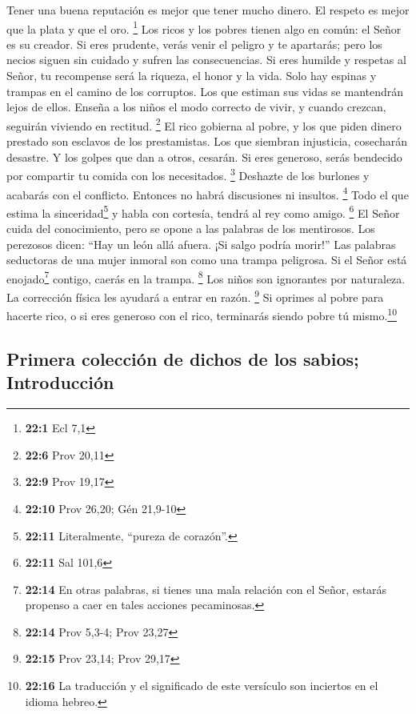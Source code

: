  Tener una buena reputación es mejor que tener mucho
dinero. El respeto es mejor que la plata y que el oro. \footnote{\textbf{22:1}
  Ecl 7,1}  Los ricos y los pobres tienen algo en común:
el Señor es su creador.  Si eres prudente, verás venir el
peligro y te apartarás; pero los necios siguen sin cuidado y sufren las
consecuencias.  Si eres humilde y respetas al Señor, tu
recompense será la riqueza, el honor y la vida.  Solo hay
espinas y trampas en el camino de los corruptos. Los que estiman sus
vidas se mantendrán lejos de ellos.  Enseña a los niños el
modo correcto de vivir, y cuando crezcan, seguirán viviendo en rectitud.
\footnote{\textbf{22:6} Prov 20,11}  El rico gobierna al
pobre, y los que piden dinero prestado son esclavos de los prestamistas.
 Los que siembran injusticia, cosecharán desastre. Y los
golpes que dan a otros, cesarán.  Si eres generoso, serás
bendecido por compartir tu comida con los necesitados. \footnote{\textbf{22:9}
  Prov 19,17}  Deshazte de los burlones y acabarás con el
conflicto. Entonces no habrá discusiones ni insultos. \footnote{\textbf{22:10}
  Prov 26,20; Gén 21,9-10}  Todo el que estima la
sinceridad\footnote{\textbf{22:11} Literalmente, ``pureza de corazón''.}
y habla con cortesía, tendrá al rey como amigo. \footnote{\textbf{22:11}
  Sal 101,6}  El Señor cuida del conocimiento, pero se
opone a las palabras de los mentirosos.  Los perezosos
dicen: ``Hay un león allá afuera. ¡Si salgo podría morir!''
 Las palabras seductoras de una mujer inmoral son como
una trampa peligrosa. Si el Señor está enojado\footnote{\textbf{22:14}
  En otras palabras, si tienes una mala relación con el Señor, estarás
  propenso a caer en tales acciones pecaminosas.} contigo, caerás en la
trampa. \footnote{\textbf{22:14} Prov 5,3-4; Prov 23,27} 
Los niños son ignorantes por naturaleza. La corrección física les
ayudará a entrar en razón. \footnote{\textbf{22:15} Prov 23,14; Prov
  29,17}  Si oprimes al pobre para hacerte rico, o si
eres generoso con el rico, terminarás siendo pobre tú mismo.\footnote{\textbf{22:16}
  La traducción y el significado de este versículo son inciertos en el
  idioma hebreo.}

\hypertarget{primera-colecciuxf3n-de-dichos-de-los-sabios-introducciuxf3n}{%
\subsection{Primera colección de dichos de los sabios;
Introducción}\label{primera-colecciuxf3n-de-dichos-de-los-sabios-introducciuxf3n}}

